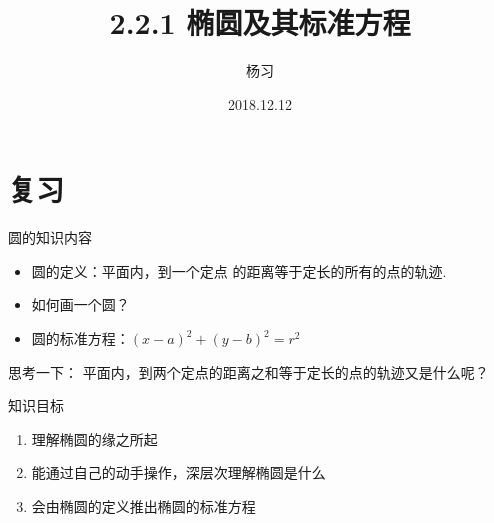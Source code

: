 \documentclass{beamer}
\title{2.2.1 椭圆及其标准方程}
\author{杨习}
\institute{shineyoung7@163.com}
\date{2018.12.12}
\begin{document}
    \begin{frame}
        \maketitle
    \end{frame}

    \section{复习}
    \begin{frame}{\qquad 圆的知识内容}
        \begin{itemize}
          \item \textcolor{ln}{圆的定义：}\pause 平面内，到\alert{一个定点} 的\textcolor{example}{距离等于定长}的所有的点的轨迹. \pause
          \item \textcolor{ln}{如何画一个圆？}\pause
          \item \textcolor{ln}{圆的标准方程：}\pause $ (x-a)^2+(y-b)^2=r^2 $
        \end{itemize}\pause
        \begin{block}{思考一下：}
          平面内，到\alert{两个定点的距离之和}等于\alert{定长}的点的轨迹又是什么呢？
        \end{block}


    \end{frame}

    \begin{frame}{\qquad 知识目标}
      \begin{enumerate}
        \item 理解椭圆的缘之所起
        \item 能通过自己的动手操作，深层次理解椭圆是什么
        \item 会由椭圆的定义推出椭圆的标准方程
      \end{enumerate}
    \end{frame}
\end{document}
